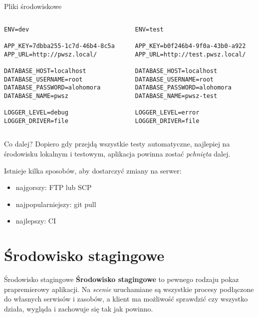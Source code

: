 \begin{frame}[fragile]{Pliki środowiskowe}
\begin{columns}
\begin{column}{0.5\textwidth}
\begin{lstlisting}
ENV=dev

APP_KEY=7dbba255-1c7d-46b4-8c5a
APP_URL=http://pwsz.local/

DATABASE_HOST=localhost
DATABASE_USERNAME=root
DATABASE_PASSWORD=alohomora
DATABASE_NAME=pwsz

LOGGER_LEVEL=debug
LOGGER_DRIVER=file
\end{lstlisting}
\end{column}
\begin{column}{0.5\textwidth}
\begin{lstlisting}
ENV=test

APP_KEY=b0f246b4-9f0a-43b0-a922
APP_URL=http://test.pwsz.local/

DATABASE_HOST=localhost
DATABASE_USERNAME=root
DATABASE_PASSWORD=alohomora
DATABASE_NAME=pwsz-test

LOGGER_LEVEL=error
LOGGER_DRIVER=file
\end{lstlisting}
\end{column}
\end{columns}
\end{frame}

\begin{frame}{Co dalej?}
	Dopiero gdy przejdą wszystkie testy automatyczne, najlepiej na środowisku lokalnym i testowym, aplikacja powinna zostać \emph{pchnięta} dalej.
	
	Istnieje kilka sposobów, aby dostarczyć zmiany na serwer:
	\begin{itemize}
		\item najgorszy: FTP lub SCP
		\item najpopularniejszy: git pull
		\item najlepszy: CI
	\end{itemize}
\end{frame}

\section{Środowisko stagingowe}

\begin{frame}{Środowisko stagingowe}
	\textbf{Środowisko stagingowe} to pewnego rodzaju pokaz prapremierowy aplikacji. Na \emph{scenie} uruchamiane są wszystkie procesy podłączone do własnych serwisów i zasobów, a klient ma możliwość sprawdzić czy wszystko działa, wygląda i zachowuje się tak jak powinno.
\end{frame}


